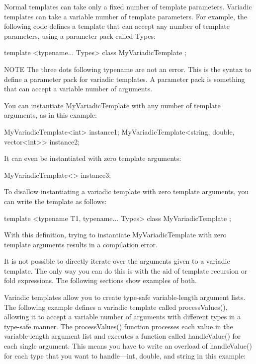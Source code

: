 
Normal templates can take only a fixed number of template parameters. Variadic templates can take a variable number of template parameters. For example, the following code defines a template that can accept any number of template parameters, using a parameter pack called Types:

\begin{cpp}
template <typename... Types>
class MyVariadicTemplate { };
\end{cpp}

\begin{myNotic}{NOTE}
The three dots following typename are not an error. This is the syntax to define a parameter pack for variadic templates. A parameter pack is something that can accept a variable number of arguments.
\end{myNotic}

You can instantiate MyVariadicTemplate with any number of template arguments, as in this example:

\begin{cpp}
MyVariadicTemplate<int> instance1;
MyVariadicTemplate<string, double, vector<int>> instance2;
\end{cpp}

It can even be instantiated with zero template arguments:

\begin{cpp}
MyVariadicTemplate<> instance3;
\end{cpp}

To disallow instantiating a variadic template with zero template arguments, you can write the template as follows:

\begin{cpp}
template <typename T1, typename... Types>
class MyVariadicTemplate { };
\end{cpp}

With this definition, trying to instantiate MyVariadicTemplate with zero template arguments results in a compilation error.

It is not possible to directly iterate over the arguments given to a variadic template. The only way you can do this is with the aid of template recursion or fold expressions. The following sections show examples of both.



Variadic templates allow you to create type-safe variable-length argument lists. The following example defines a variadic template called processValues(), allowing it to accept a variable number of arguments with different types in a type-safe manner. The processValues() function processes each value in the variable-length argument list and executes a function called handleValue() for each single argument. This means you have to write an overload of handleValue() for each type that you want to handle—int, double, and string in this example:

